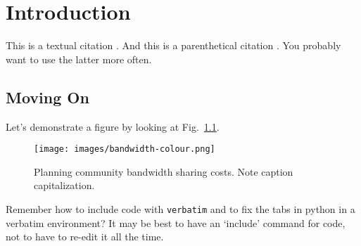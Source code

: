\chapter{Introduction}



This is a textual citation \citet{shannon44}. And this is a parenthetical citation \citep{shannon44}. You probably want to use the latter more often.

\section{Moving On}
Let's demonstrate a figure by looking at Fig.~\ref{bandwidth}. 

\begin{figure}[!h]
\centering 
\texttt{[image: images/bandwidth-colour.png]}
\caption{Planning community bandwidth sharing costs. 
  Note caption capitalization.}
\label{bandwidth} 
\end{figure}

Remember how to include code with {\tt verbatim} 
and to fix the tabs in {\sf python} in a verbatim environment? 
It may be best to have an `include' command for code, 
not to have to re-edit it all the time.


